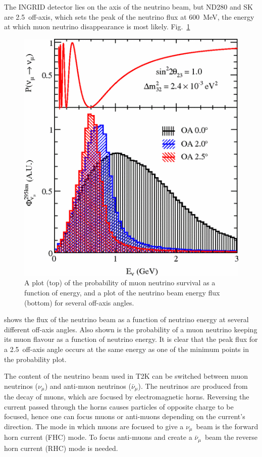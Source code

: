 \documentclass[aps,pra,12pt,notitlepage,tightenlines]{revtex4-1}
\newcommand{\numu}{$\nu_\mu$}
\newcommand{\anumu}{$\bar\nu_\mu$}
\begin{document}
The INGRID detector lies on the axis of the neutrino beam, but ND280 and SK are 2.5\degree\ off-axis, which sets the peak of the neutrino flux at 600~MeV, the energy at which muon neutrino disappearance is most likely. Fig.\ \ref{fig:axis} 
\begin{figure}
 \includegraphics[scale=0.5]{axis.png}
 \caption{A plot (top) of the probability of muon neutrino survival as a function of energy, and a plot of the neutrino beam energy flux (bottom) for several off-axis angles.}
 \label{fig:axis}
\end{figure}
shows the flux of the neutrino beam as a function of neutrino energy at several different off-axis angles. Also shown is the probability of a muon neutrino keeping its muon flavour as a function of neutrino energy. It is clear that the peak flux for a 2.5\degree\ off-axis angle occurs at the same energy as one of the minimum points in the probability plot.

The content of the neutrino beam used in T2K can be switched between muon neutrinos (\numu) and anti-muon neutrinos (\anumu). The neutrinos are produced from the decay of muons, which are focused by electromagnetic horns. Reversing the current passed through the horns causes particles of opposite charge to be focused, hence one can focus muons or anti-muons depending on the current's direction. The mode in which muons are focused to give a \numu \ beam is the forward horn current (FHC) mode. To focus anti-muons and create a \anumu \ beam the reverse horn current (RHC) mode is needed.
\end{document}
